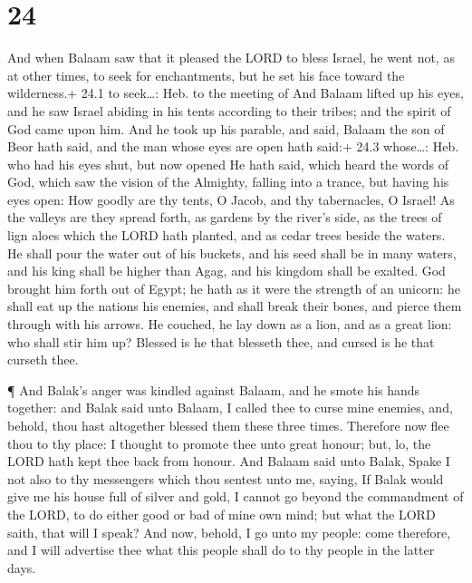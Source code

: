 \hypertarget{section-23}{%
\section{24}\label{section-23}}

 And when Balaam saw that it pleased the LORD to bless
Israel, he went not, as at other times, to seek for enchantments, but he
set his face toward the wilderness.+ 24.1 to seek\ldots: Heb. to the
meeting of  And Balaam lifted up his eyes, and he saw Israel
abiding in his tents according to their tribes; and the spirit of God
came upon him.  And he took up his parable, and said, Balaam
the son of Beor hath said, and the man whose eyes are open hath said:+
24.3 whose\ldots: Heb. who had his eyes shut, but now opened
 He hath said, which heard the words of God, which saw the
vision of the Almighty, falling into a trance, but having his eyes open:
 How goodly are thy tents, O Jacob, and thy tabernacles, O
Israel!  As the valleys are they spread forth, as gardens by
the river's side, as the trees of lign aloes which the LORD hath
planted, and as cedar trees beside the waters.  He shall
pour the water out of his buckets, and his seed shall be in many waters,
and his king shall be higher than Agag, and his kingdom shall be
exalted.  God brought him forth out of Egypt; he hath as it
were the strength of an unicorn: he shall eat up the nations his
enemies, and shall break their bones, and pierce them through with his
arrows.  He couched, he lay down as a lion, and as a great
lion: who shall stir him up? Blessed is he that blesseth thee, and
cursed is he that curseth thee.

 ¶ And Balak's anger was kindled against Balaam, and he
smote his hands together: and Balak said unto Balaam, I called thee to
curse mine enemies, and, behold, thou hast altogether blessed them these
three times.  Therefore now flee thou to thy place: I
thought to promote thee unto great honour; but, lo, the LORD hath kept
thee back from honour.  And Balaam said unto Balak, Spake I
not also to thy messengers which thou sentest unto me, saying,
 If Balak would give me his house full of silver and gold,
I cannot go beyond the commandment of the LORD, to do either good or bad
of mine own mind; but what the LORD saith, that will I speak?
 And now, behold, I go unto my people: come therefore, and
I will advertise thee what this people shall do to thy people in the
latter days.

